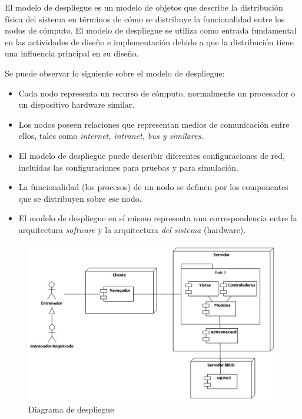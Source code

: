 		El modelo de despliegue es un modelo de objetos que describe la distribución física del sistema en términos de cómo se distribuye la funcionalidad entre los nodos de cómputo. El modelo de despliegue se utiliza como entrada fundamental en las actividades de diseño e implementación debido a que la distribución tiene una influencia principal en su diseño.
		
		Se puede observar lo siguiente sobre el modelo de despliegue:
		\begin{itemize}
			\item Cada nodo representa un recurso de cómputo, normalmente un procesador o un dispositivo hardware similar.
			\item Los nodos poseen relaciones que representan medios de comunicación entre ellos, tales como {\it internet, intranet, bus y similares}.
			\item El modelo de despliegue puede describir diferentes configuraciones de red, incluidas las configuraciones para pruebas y para simulación.
			\item La funcionalidad (los procesos) de un nodo se definen por los componentes que se distribuyen sobre ese nodo.
			\item El modelo de despliegue en sí mismo representa una correspondencia entre la arquitectura {\it software} y la arquitectura {\it del sistema} (hardware).
		\end{itemize}
	
		\begin{figure}[H]
		  \centering
		    \includegraphics[width=14cm]{./eps/di_diagdespliegue/di_diagdespliegue.eps}
		  \caption{Diagrama de despliegue}
		  \label{fig:di_diag_despliegue}
		\end{figure}
		

